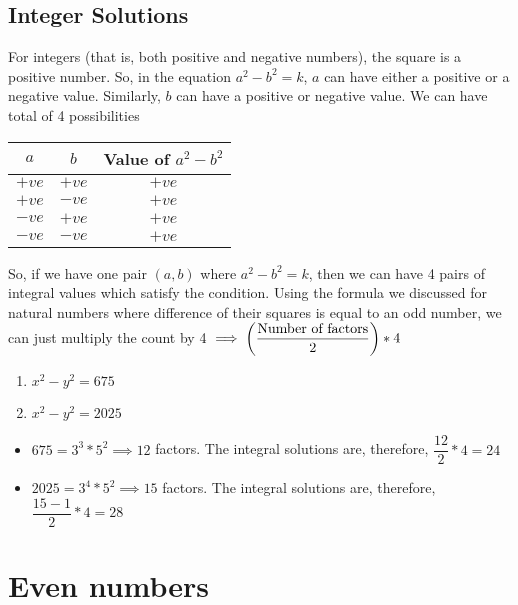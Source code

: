 \subsection{Integer Solutions}
For integers (that is, both positive and negative numbers), the square is a positive number. So, in the equation $a^2 - b^2 = k$, $a$ can have either a positive or a negative value. Similarly, $b$ can have a positive or negative value. We can have total of 4 possibilities

\begin{table}[h!]
    \centering
    \begin{tabular}{|| c | c | c ||}
         \hline
         $a$ & $b$ & Value of $a^2 - b^2$ \\
         \hline
         $+ve$ & $+ve$ & $+ve$ \\ 
         $+ve$ & $-ve$ & $+ve$  \\ 
         $-ve$ & $+ve$ & $+ve$  \\ 
         $-ve$ & $-ve$ & $+ve$  \\ 
         \hline
    \end{tabular}
\end{table}

So, if we have one pair $(a,b)$ where $a^2 - b^2 = k$, then we can have 4 pairs of integral values which satisfy the condition. Using the formula we discussed for natural numbers where difference of their squares is equal to an odd number, we can just multiply the count by 4 $\implies \left ( \dfrac{\text{Number of factors}}{2} \right ) * 4$ 

\begin{enumerate}
    \item $x^2 - y^2 = 675$
    \item $x^2 - y^2 = 2025$
\end{enumerate}

\begin{itemize}
    \item $675 = 3^3 * 5^2 \implies 12$ factors. The integral solutions are, therefore, $\dfrac{12}{2} * 4 = 24$

    \item $2025 = 3^4 * 5^2 \implies 15 $ factors. The integral solutions are, therefore, $\dfrac{15 - 1}{2} * 4 = 28$
\end{itemize}

\section{Even numbers}

